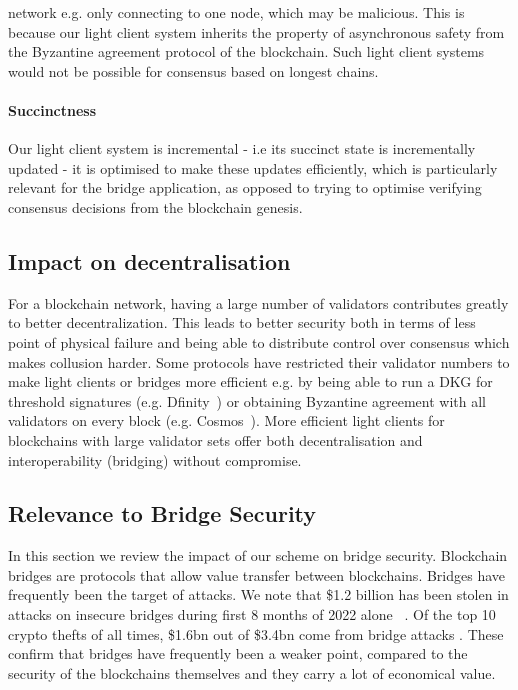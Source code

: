 network e.g. only connecting to one node, which may be malicious. This is because our light client system inherits the property of asynchronous safety from the Byzantine agreement 
protocol of the blockchain. Such light client systems would not be possible for consensus based on longest chains.  
\vspace{-0.2cm}
\noindent\paragraph{Succinctness}Our light client system is incremental - i.e its succinct state is incrementally updated - it is optimised to make these updates efficiently, which is particularly relevant for the bridge application, as opposed to trying to optimise verifying consensus decisions from the blockchain genesis.
\vspace{-0.2cm}
\subsection{Impact on decentralisation} For a blockchain network, having  a large number of validators  contributes greatly to better decentralization. This leads to better security both in terms of less point of physical failure and being able to distribute control over consensus which makes collusion harder. Some protocols have restricted their validator numbers to make light clients or bridges more efficient e.g. by being able to run a DKG for threshold signatures (e.g. Dfinity~\cite{dfinity}) or obtaining Byzantine agreement with all validators on every block (e.g. Cosmos~\cite{tendermint_paper}). More efficient light clients for blockchains with large validator sets offer both decentralisation and interoperability (bridging) without compromise.

\vspace{-0.25cm}
\subsection{Relevance to Bridge Security} 
\noindent In this section we review the impact of our scheme on bridge security. Blockchain bridges are protocols that allow value transfer between blockchains. Bridges have frequently been the target of attacks. We note that \$1.2 billion has been stolen in attacks on insecure bridges during first 8 months of 2022 alone ~\cite{elliptic_harmony,elliptic_nomad}. Of the top 10 crypto thefts of all times, \$1.6bn out of \$3.4bn come from bridge attacks \cite{elliptic_nomad}. These confirm that bridges have frequently been a weaker point, compared to the security of the blockchains themselves and they carry a lot of economical value. \\

